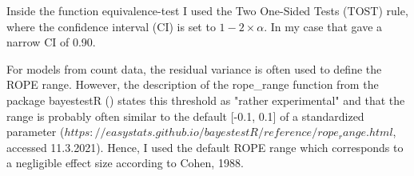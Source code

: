 Inside the function equivalence-test I used the Two One-Sided Tests (TOST) rule, where the confidence interval (CI) is set to $1 - 2\times \alpha$. In my case that gave a narrow CI of 0.90.

For models from count data, the residual variance is often used to define the ROPE range. However, the description of the rope\_range function from the package bayestestR () states this threshold as "rather experimental" and that the range is probably often similar to the default [-0.1, 0.1] of a standardized parameter ($https://easystats.github.io/bayestestR/reference/rope_range.html$, accessed 11.3.2021). %
Hence, I used the default ROPE range which corresponds to a negligible effect size according to Cohen, 1988.









